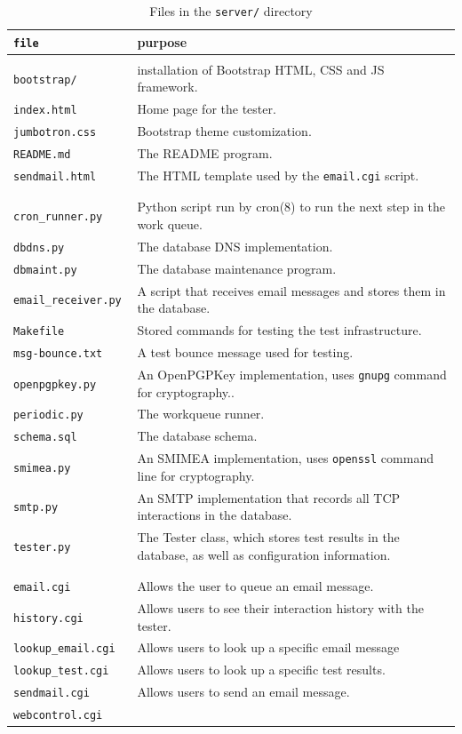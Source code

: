 \documentclass[preprint,3p,11pt]{elsarticle}
\begin{document}
\begin{table}
\begin{tabularx}{\textwidth}{|>{\tt}lX|}
\hline
\textrm{file} & purpose\\
\hline
\multicolumn{2}{l}{\textbf{HTML files:}}\\
bootstrap/         & installation of Bootstrap HTML, CSS and JS framework.\\
index.html         & Home page for the tester.\\
jumbotron.css      & Bootstrap theme customization.\\
README.md          & The README program.\\
sendmail.html      & The HTML template used by the \texttt{email.cgi} script.\\
\\
\multicolumn{2}{l}{\textbf{Python Modules and Scripts:}}\\
cron\_runner.py    & Python script run by cron(8) to run the next step in the work queue.  \\
dbdns.py           & The database DNS implementation.\\
dbmaint.py         & The database maintenance program.\\
email\_receiver.py & A script that receives email messages and stores them in the database.\\
Makefile           & Stored commands for testing the test infrastructure.\\
msg-bounce.txt     & A test bounce message used for testing.\\
openpgpkey.py      & An OpenPGPKey implementation, uses \texttt{gnupg} command for cryptography..\\
periodic.py        & The workqueue runner.\\
schema.sql         & The database schema.\\
smimea.py          & An SMIMEA implementation, uses \texttt{openssl} command line for cryptography.\\ 
smtp.py            & An SMTP implementation that records all TCP interactions in the database.\\
tester.py          & The Tester class, which stores test results in the database, as well as configuration information.\\
\\
\multicolumn{2}{l}{\textbf{CGI Scripts:}}\\
email.cgi         & Allows the user to queue an email message.\\
history.cgi       & Allows users to see their interaction history with the tester.\\
lookup\_email.cgi & Allows users to look up a specific email message\\
lookup\_test.cgi  & Allows users to look up a specific test results.\\
sendmail.cgi      & Allows users to send an email message. \\
webcontrol.cgi    & \\
\hline
\end{tabularx}
\caption{Files in the \texttt{server/} directory}\label{server-files}
\end{table}
\end{document}
